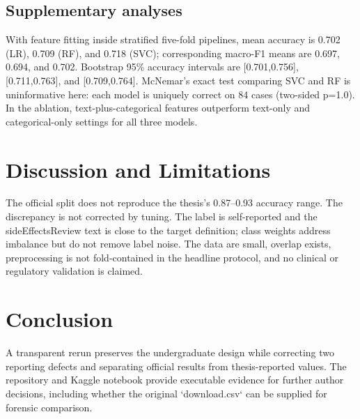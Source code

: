 \documentclass[conference]{IEEEtran}
\begin{document}
\subsection{Supplementary analyses}
With feature fitting inside stratified five-fold pipelines, mean accuracy is 0.702 (LR), 0.709 (RF), and 0.718 (SVC); corresponding macro-F1 means are 0.697, 0.694, and 0.702. Bootstrap 95\% accuracy intervals are [0.701,0.756], [0.711,0.763], and [0.709,0.764]. McNemar's exact test comparing SVC and RF is uninformative here: each model is uniquely correct on 84 cases (two-sided p=1.0). In the ablation, text-plus-categorical features outperform text-only and categorical-only settings for all three models.

\section{Discussion and Limitations}
The official split does not reproduce the thesis's 0.87--0.93 accuracy range. The discrepancy is not corrected by tuning. The label is self-reported and the sideEffectsReview text is close to the target definition; class weights address imbalance but do not remove label noise. The data are small, overlap exists, preprocessing is not fold-contained in the headline protocol, and no clinical or regulatory validation is claimed.

\section{Conclusion}
A transparent rerun preserves the undergraduate design while correcting two reporting defects and separating official results from thesis-reported values. The repository and Kaggle notebook provide executable evidence for further author decisions, including whether the original `download.csv` can be supplied for forensic comparison.



\end{document}
